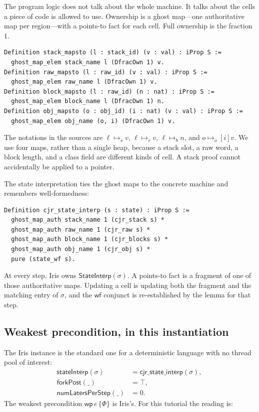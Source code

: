 \documentclass[11pt]{article}
\newcommand{\WF}{\mathsf{wf}}
\newcommand{\ptss}{\mathrel{\mapsto_{s}}}
\newcommand{\ptsr}{\mathrel{\mapsto_{r}}}
\newcommand{\ptsb}{\mathrel{\mapsto_{b}}}
\newcommand{\ptso}{\mathrel{\mapsto_{o}}}
\newcommand{\Wpre}{\mathsf{wp}}
\begin{document}
The program logic does not talk about the whole machine.
It talks about the cells a piece of code is allowed to use.
Ownership is a ghost map---one authoritative map per region---with a points-to fact for each cell.
Full ownership is the fraction \(1\).

\begin{lstlisting}
Definition stack_mapsto (l : stack_id) (v : val) : iProp S :=
  ghost_map_elem stack_name l (DfracOwn 1) v.
Definition raw_mapsto (l : raw_id) (v : val) : iProp S :=
  ghost_map_elem raw_name l (DfracOwn 1) v.
Definition block_mapsto (l : raw_id) (n : nat) : iProp S :=
  ghost_map_elem block_name l (DfracOwn 1) n.
Definition obj_mapsto (o : obj_id) (i : nat) (v : val) : iProp S :=
  ghost_map_elem obj_name (o, i) (DfracOwn 1) v.
\end{lstlisting}

The notations in the sources are \(\ell \ptss v\), \(\ell \ptsr v\), \(\ell \ptsb n\), and \(o \ptso[i] v\).
We use four maps, rather than a single heap, because a stack slot, a raw word, a block length, and a class field are different kinds of cell.
A stack proof cannot accidentally be applied to a pointer.

The state interpretation ties the ghost maps to the concrete machine and remembers well-formedness:

\begin{lstlisting}
Definition cjr_state_interp (s : state) : iProp S :=
  ghost_map_auth stack_name 1 (cjr_stack s) *
  ghost_map_auth raw_name 1 (cjr_raw s) *
  ghost_map_auth block_name 1 (cjr_blocks s) *
  ghost_map_auth obj_name 1 (cjr_obj s) *
  pure (state_wf s).
\end{lstlisting}

At every step, Iris owns \(\mathsf{StateInterp}(\sigma)\).
A points-to fact is a fragment of one of those authoritative maps.
Updating a cell is updating both the fragment and the matching entry of \(\sigma\), and the \(\WF\) conjunct is re-established by the lemma for that step.

\subsection{Weakest precondition, in this instantiation}

The Iris instance is the standard one for a deterministic language with no thread pool of interest:
\[
\begin{aligned}
\mathsf{stateInterp}(\sigma) &= \mathsf{cjr\_state\_interp}(\sigma),\\
\mathsf{forkPost}(\_) &= \top,\\
\mathsf{numLatersPerStep}(\_) &= 0.
\end{aligned}
\]
The weakest precondition \(\Wpre\,e\,\{\Phi\}\) is Iris's.
For this tutorial the reading is:
\end{document}
